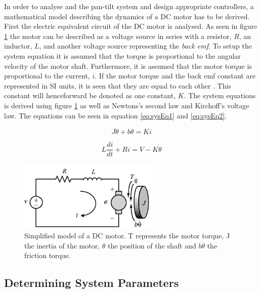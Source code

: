 \documentclass[../../main.tex]{subfiles}
\begin{document}
In order to analyse and the pan-tilt system and design appropriate controllers, a mathematical model describing the dynamics of a DC motor has to be derived. First the electric equivalent circuit of the DC motor is analysed. As seen in figure \ref{fig:Armature_Circuit} the motor can be described as a voltage source in series with a resistor, $R$, an inductor, $L$, and another voltage source representing the \textit{back emf}. To setup the system equation it is assumed that the torque is proportional to the angular velocity of the motor shaft. Furthermore, it is assumed that the motor torque is proportional to the current, $i$. If the motor torque and the back emf constant are represented in SI units, it is seen that they are equal to each other \cite{universityofmichigan2019}. This constant will henceforward be denoted as one constant, $K$. The system equations is derived using figure \ref{fig:Armature_Circuit} as well as Newtons's second law and Kirchoff's voltage law. The equations can be seen in equation \ref{eq:sysEq1} and \ref{eq:sysEq2}.

\begin{equation}
    J\ddot{\theta}+b\theta = K i
    \label{eq:sysEq1}
\end{equation}

\begin{equation}
    L \frac{di}{dt} + R i = V -K \dot{\theta}
    \label{eq:sysEq2}
\end{equation}


\begin{figure}[H]
    \centering
    \includegraphics[width=0.6\textwidth]{Sections/System_Modelling/Images/Armature_Layout.PNG}
    \caption{Simplified model of a DC motor. T represents the motor torque, J the inertia of the motor, $\theta$ the position of the shaft and $b\dot{\theta}$ the friction torque. \cite{universityofmichigan2019}}
    \label{fig:Armature_Circuit}
\end{figure}

\subsection{Determining System Parameters}\label{subsec:motorParameters}
\end{document}
